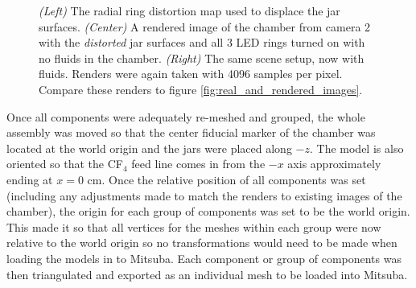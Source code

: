 \documentclass[11pt, letterpaper]{extarticle} %
\begin{document}
\begin{figure}[h]
    \centering
    \hfill
    \hfill
    \caption{\textit{(Left)} The radial ring distortion map used to displace the jar surfaces. \textit{(Center)} A rendered image of the chamber from camera 2 with the \textit{distorted} jar surfaces and all 3 LED rings turned on with no fluids in the chamber. \textit{(Right)} The same scene setup, now with fluids. Renders were again taken with 4096 samples per pixel. Compare these renders to figure \ref{fig:real_and_rendered_images}.}
    \label{fig:distorted_jars_renders}
\end{figure}

Once all components were adequately re-meshed and grouped, the whole assembly was moved so that the center fiducial marker of the chamber was located at the world origin and the jars were placed along $-z$. The model is also oriented so that the CF$_4$ feed line comes in from the $-x$ axis approximately ending at $x = 0$ cm. Once the relative position of all components was set (including any adjustments made to match the renders to existing images of the chamber), the origin for each group of components was set to be the world origin. This made it so that all vertices for the meshes within each group were now relative to the world origin so no transformations would need to be made when loading the models in to Mitsuba. Each component or group of components was then triangulated and exported as an individual mesh to be loaded into Mitsuba.
\end{document}
